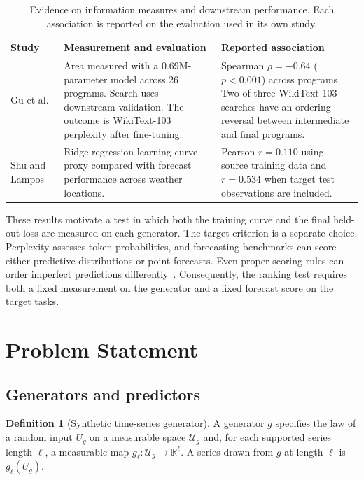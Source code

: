 \documentclass[10pt,a4paper]{article}
\theoremstyle{definition}
\newtheorem{definition}{Definition}
\begin{document}
\begin{table}[htbp]
\centering\small
\caption{Evidence on information measures and downstream performance.
Each association is reported on the evaluation used in its own study.}
\label{tab:related-evidence}
\begin{tabularx}{\linewidth}{@{}>{\raggedright\arraybackslash}p{29mm}
>{\raggedright\arraybackslash}X>{\raggedright\arraybackslash}X@{}}
\toprule
Study & Measurement and evaluation & Reported association\\
\midrule
Gu et al.~\cite{gu2026precocial}
& Area measured with a 0.69M-parameter model across 26 programs. Search uses downstream validation. The outcome is WikiText-103 perplexity after fine-tuning.
& Spearman $\rho=-0.64$ ($p<0.001$) across programs. Two of three WikiText-103 searches have an ordering reversal between intermediate and final programs.\\
\addlinespace[3pt]
Shu and Lampos~\cite{shu2026maps}
& Ridge-regression learning-curve proxy compared with forecast performance across weather locations.
& Pearson $r=0.110$ using source training data and $r=0.534$ when target test observations are included.\\
\bottomrule
\end{tabularx}
\end{table}

These results motivate a test in which both the training curve and the
final held-out loss are measured on each generator. The target criterion
is a separate choice. Perplexity assesses token probabilities, and
forecasting benchmarks can score either predictive distributions or point
forecasts. Even proper scoring rules can order imperfect predictions
differently~\cite{gneiting2007}. Consequently, the ranking test requires
both a fixed measurement on the generator and a fixed forecast score on
the target tasks.

\clearpage
\section{Problem Statement}\label{sec:problem}

\subsection{Generators and predictors}
\begin{definition}[Synthetic time-series generator]
A generator $g$ specifies the law of a random input $U_g$ on a measurable
space $\mathcal U_g$ and, for each supported series length $\ell$, a measurable
map $g_\ell\colon\mathcal U_g\to\mathbb R^\ell$. A series drawn from $g$ at
length $\ell$ is $g_\ell(U_g)$.
\end{definition}
\end{document}
